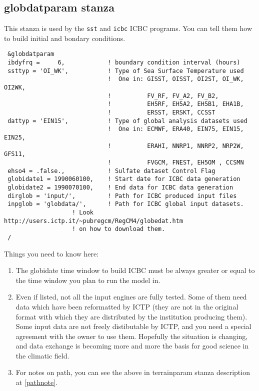 \subsection{globdatparam stanza}

This stanza is used by the \verb=sst= and \verb=icbc= ICBC programs. You can
tell them how to build initial and bondary conditions.

{\footnotesize
\begin{Verbatim}
 &globdatparam
 ibdyfrq =     6,            ! boundary condition interval (hours)
 ssttyp = 'OI_WK',           ! Type of Sea Surface Temperature used
                             !  One in: GISST, OISST, OI2ST, OI_WK, OI2WK,
                             !          FV_RF, FV_A2, FV_B2,
                             !          EH5RF, EH5A2, EH5B1, EHA1B,
                             !          ERSST, ERSKT, CCSST
 dattyp = 'EIN15',           ! Type of global analysis datasets used
                             !  One in: ECMWF, ERA40, EIN75, EIN15, EIN25,
                             !          ERAHI, NNRP1, NNRP2, NRP2W, GFS11,
                             !          FVGCM, FNEST, EH5OM , CCSMN
 ehso4 = .false.,            ! Sulfate dataset Control Flag
 globidate1 = 1990060100,    ! Start date for ICBC data generation
 globidate2 = 1990070100,    ! End data for ICBC data generation
 dirglob = 'input/',         ! Path for ICBC produced input files
 inpglob = 'globdata/',      ! Path for ICBC global input datasets.
                   ! Look http://users.ictp.it/~pubregcm/RegCM4/globedat.htm
                   ! on how to download them.
 /
\end{Verbatim}
}

Things you need to know here:

\begin{enumerate}
\item The globidate time window to build ICBC must be always greater or equal to
the time window you plan to run the model in.
\item Even if listed, not all the input engines are fully tested. Some of them
need data which have been reformatted by ICTP (they are not in the original
format with which they are distributed by the institution producing them).
Some input data are not freely distibutable by ICTP, and you need a special
agreement with the owner to use them.
Hopefully the situation is changing, and data exchange is becoming more and more
the basis for good science in the climatic field.
\item For notes on path, you can see the above in terrainparam stanza
description at \ref{pathnote}.
\end{enumerate}

